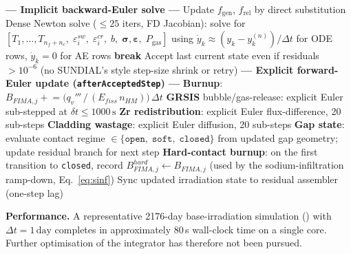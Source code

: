 \begin{refsection}
\begin{algorithm}[H]
\caption{FRED-M-Na: one fixed step $t_n \to t_{n+1} = t_n + \Delta t$}
\label{alg:mna_timestep}
\begin{algorithmic}[1]
  \Statex \textbf{--- Implicit backward-Euler solve ---}
    \State Update $f_\mathrm{gen}$, $f_\mathrm{rel}$ by direct substitution
      \State Dense Newton solve ($\leq 25$ iters, FD Jacobian):
      \Statex \qquad\qquad solve for $[T_1,\ldots,T_{n_f+n_c},\;
                 \varepsilon^{sw}_i,\; \varepsilon^{cr}_i,\;
                 b,\; \boldsymbol{\sigma}, \boldsymbol{\varepsilon},\; P_\mathrm{gas}]$
      \Statex \qquad\qquad using $\dot{y}_k \approx (y_k - y_k^{(n)})/\Delta t$
                 for ODE rows, $\dot{y}_k = 0$ for AE rows
    \EndFor
      \State \textbf{break}
    \EndIf
  \EndFor
  \State Accept last current state even if residuals $> 10^{-6}$   (no SUNDIAL's style step-size shrink or retry)
  \Statex
  \Statex \textbf{--- Explicit forward-Euler update (\texttt{afterAcceptedStep}) ---}
    \State \textbf{Burnup}: $B_{FIMA,j} \mathrel{+}= \bigl(q_v''' \,/\, (E_{fiss}\,n_{HM})\bigr)\,\Delta t$
    \State \textbf{GRSIS} bubble/gas-release: explicit Euler sub-stepped at
           $\delta t \leq 1000\,\mathrm{s}$
    \State \textbf{Zr redistribution}: explicit Euler flux-difference, 20 sub-steps
    \State \textbf{Cladding wastage}: explicit Euler diffusion, 20 sub-steps
    \State \textbf{Gap state}: evaluate contact regime $\in \{\texttt{open},\; \texttt{soft},\; \texttt{closed}\}$ from updated gap geometry; update residual branch for next step
    \State \textbf{Hard-contact burnup}: on the first transition to \texttt{closed}, record $B_{FIMA,j}^{hard} \gets B_{FIMA,j}$ (used by the sodium-infiltration ramp-down, Eq.~\eqref{eq:sinf})
  \EndFor
  \State Sync updated irradiation state to residual assembler (one-step lag)
\end{algorithmic}
\end{algorithm}

\noindent\textbf{Performance.} A representative 2176-day base-irradiation simulation () with $\Delta t = 1\,\mathrm{day}$ completes in approximately 80\,s wall-clock time on a single core.  Further optimisation of the integrator has therefore not been pursued.


\end{refsection}
